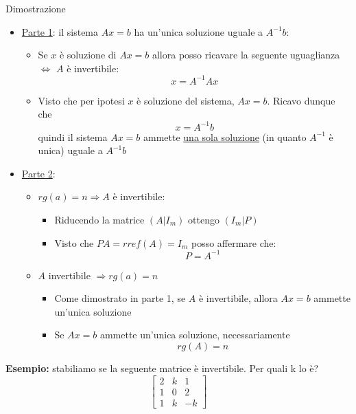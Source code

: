 \documentclass[12pt,a4paper,oneside]{article}
\begin{document}
Dimostrazione
\begin{itemize}
	\item \underline{Parte 1}: il sistema $Ax= b$ ha un'unica soluzione uguale a $A^{-1}b$:
	      \begin{itemize}
		      \item Se $x$ è soluzione di $Ax=b$ allora posso ricavare la seguente uguaglianza $\Leftrightarrow$ $A$ è invertibile:
		            \[
			            x =  A^{-1}Ax
		            \]
		      \item Visto che per ipotesi $x$ è soluzione del sistema, $Ax=b$. Ricavo dunque che
		            \[
			            x=A^{-1}b
		            \]
		            quindi il sistema  $Ax=b$ ammette \underline{una sola soluzione} (in quanto $A^{-1}$ è unica) uguale a $A^{-1}b$
	      \end{itemize}
	\item \underline{Parte 2}:
	      \begin{itemize}
		      \item $rg\left( a \right) = n \Rightarrow A$  è invertibile:
		            \begin{itemize}
			            \item Riducendo la matrice $\left( A|I_m \right) $ ottengo $\left( I_m|P \right) $
			            \item Visto che $PA = rref\left( A \right) = I_m$ posso affermare che:
			                  \[
				                  P=A^{-1}
			                  \]
		            \end{itemize}
		      \item $A$ invertibile $ \Rightarrow rg\left( a \right) =n$
		            \begin{itemize}
			            \item Come dimostrato in parte 1, se $A$ è invertibile, allora $Ax=b$ ammette un'unica soluzione
			            \item Se $Ax=b$ ammette un'unica soluzione, necessariamente
			                  \[
				                  rg\left( A \right) =n
			                  \]
		            \end{itemize}
	      \end{itemize}
\end{itemize}
\textbf{Esempio:}
stabiliamo se la seguente matrice è invertibile. Per quali k lo è?
\[
	\begin{bmatrix}
		2 & k & 1  \\
		1 & 0 & 2  \\
		1 & k & -k
	\end{bmatrix}
\]
\end{document}
